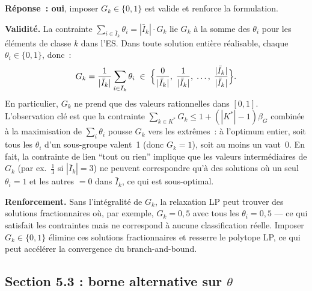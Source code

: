 \documentclass[a4paper,10pt,titlepage,leqno]{article}
\begin{document}
\begin{theorybox}

\textbf{Réponse~: oui}, imposer $G_k \in \{0,1\}$ est valide et renforce la formulation.

\textbf{Validité.} La contrainte $\sum_{i \in \bar{I}_k} \theta_i = |\bar{I}_k| \cdot G_k$ lie $G_k$ à la somme des $\theta_i$ pour les éléments de classe $k$ dans l'ES. Dans toute solution entière réalisable, chaque $\theta_i \in \{0,1\}$, donc~:
\[
  G_k = \frac{1}{|\bar{I}_k|} \sum_{i \in \bar{I}_k} \theta_i \;\in\; \Bigl\{ \frac{0}{|\bar{I}_k|},\; \frac{1}{|\bar{I}_k|},\; \ldots,\; \frac{|\bar{I}_k|}{|\bar{I}_k|} \Bigr\}.
\]
En particulier, $G_k$ ne prend que des valeurs rationnelles dans $[0,1]$. L'observation clé est que la contrainte $\sum_{k \in K^*} G_k \leq 1 + (|K^*|-1)\beta_G$ combinée à la maximisation de $\sum_i \theta_i$ pousse $G_k$ vers les extrêmes~: à l'optimum entier, soit tous les $\theta_i$ d'un sous-groupe valent~1 (donc $G_k = 1$), soit au moins un vaut~0. En fait, la contrainte de lien ``tout ou rien'' implique que les valeurs intermédiaires de $G_k$ (par ex.\ $\frac{1}{3}$ si $|\bar{I}_k| = 3$) ne peuvent correspondre qu'à des solutions où un seul $\theta_i = 1$ et les autres $= 0$ dans $\bar{I}_k$, ce qui est sous-optimal.

\textbf{Renforcement.} Sans l'intégralité de $G_k$, la relaxation LP peut trouver des solutions fractionnaires où, par exemple, $G_k = 0{,}5$ avec tous les $\theta_i = 0{,}5$ --- ce qui satisfait les contraintes mais ne correspond à aucune classification réelle. Imposer $G_k \in \{0,1\}$ élimine ces solutions fractionnaires et resserre le polytope LP, ce qui peut accélérer la convergence du branch-and-bound.
\end{theorybox}

\subsection{Section 5.3 : borne alternative sur $\theta$}
\end{document}
